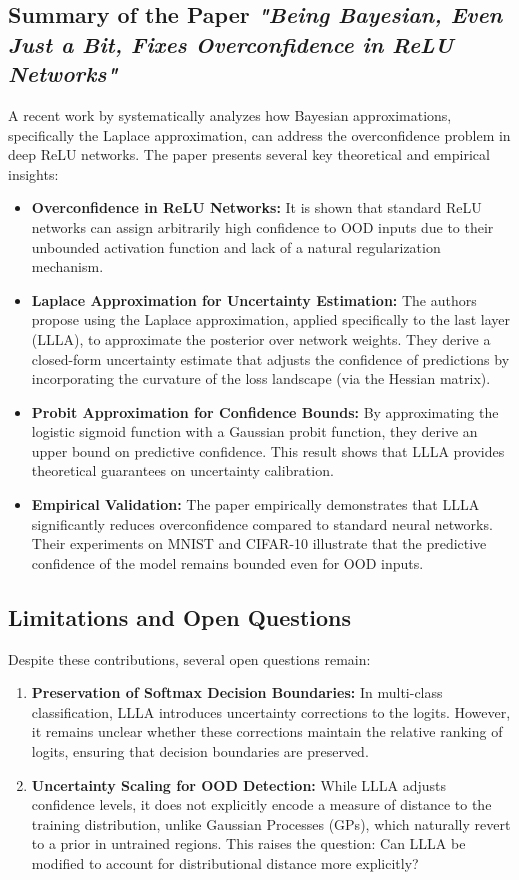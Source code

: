 \documentclass{article}
\begin{document}
\subsection{Summary of the Paper \emph{"Being Bayesian, Even Just a Bit, Fixes Overconfidence in ReLU Networks"}}

A recent work by \citet{immer2021improving} systematically analyzes how Bayesian approximations, specifically the Laplace approximation, can address the overconfidence problem in deep ReLU networks. The paper presents several key theoretical and empirical insights:

\begin{itemize}
    \item \textbf{Overconfidence in ReLU Networks:} It is shown that standard ReLU networks can assign arbitrarily high confidence to OOD inputs due to their unbounded activation function and lack of a natural regularization mechanism.
    \item \textbf{Laplace Approximation for Uncertainty Estimation:} The authors propose using the Laplace approximation, applied specifically to the last layer (LLLA), to approximate the posterior over network weights. They derive a closed-form uncertainty estimate that adjusts the confidence of predictions by incorporating the curvature of the loss landscape (via the Hessian matrix).
    \item \textbf{Probit Approximation for Confidence Bounds:} By approximating the logistic sigmoid function with a Gaussian probit function, they derive an upper bound on predictive confidence. This result shows that LLLA provides theoretical guarantees on uncertainty calibration.
    \item \textbf{Empirical Validation:} The paper empirically demonstrates that LLLA significantly reduces overconfidence compared to standard neural networks. Their experiments on MNIST and CIFAR-10 illustrate that the predictive confidence of the model remains bounded even for OOD inputs.
\end{itemize}

\subsection{Limitations and Open Questions}

Despite these contributions, several open questions remain:

\begin{enumerate}
    \item \textbf{Preservation of Softmax Decision Boundaries:} 
    In multi-class classification, LLLA introduces uncertainty corrections to the logits. However, it remains unclear whether these corrections maintain the relative ranking of logits, ensuring that decision boundaries are preserved.
    \item \textbf{Uncertainty Scaling for OOD Detection:} 
    While LLLA adjusts confidence levels, it does not explicitly encode a measure of distance to the training distribution, unlike Gaussian Processes (GPs), which naturally revert to a prior in untrained regions. This raises the question: Can LLLA be modified to account for distributional distance more explicitly?
\end{enumerate}
\end{document}
